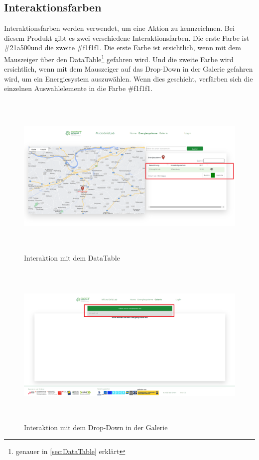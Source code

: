 \subsection{Interaktionsfarben}
Interaktionsfarben werden verwendet, um eine Aktion zu kennzeichnen. Bei diesem  Produkt gibt es zwei verschiedene Interaktionsfarben. Die erste Farbe ist \glqq\#21a500\grqq \space und die zweite 
\glqq\#f1f1f1\grqq. Die erste Farbe ist ersichtlich, wenn mit dem Mauszeiger über den DataTable\footnote{genauer in \autoref{sec:DataTable} erklärt} gefahren wird. Und die zweite Farbe wird ersichtlich, wenn mit dem Mauszeiger auf das Drop-Down in der Galerie gefahren wird, um ein Energiesystem auszuwählen. Wenn dies geschieht, verfärben sich die einzelnen Auswahlelemente in die Farbe \glqq\#f1f1f1\grqq. 
\begin{figure}[h]
	\centering
	\includegraphics[height=8cm,width=15cm]{images/InteraktionDatatable}
	\caption{Interaktion mit dem DataTable}
	\label{fig: Interaktion mit dem Datatabel}
\end{figure}
\begin{figure}[h]
	\centering
	\includegraphics[height=8cm,width=15cm]{images/InteraktionDropDown}
	\caption{Interaktion mit dem Drop-Down in der Galerie}
	\label{fig: Interaktion mit dem Datatabel}
\end{figure}
\newpage

